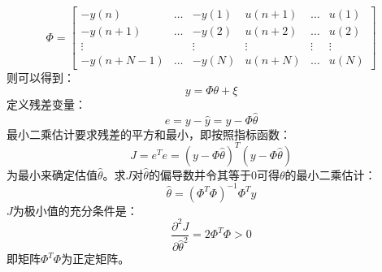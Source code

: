 \documentclass[UTF8]{article}
\begin{document}
\begin{equation*}
    \Phi = 
    \begin{bmatrix}
        -y(n) & \dots & -y(1) & u(n+1) & \dots & u(1) \\
        -y(n+1) & \dots & -y(2) & u(n+2) & \dots & u(2) \\
        \vdots & & \vdots & \vdots & \vdots & \vdots \\
        -y(n+N-1) & \dots & -y(N) & u(n+N) & \dots & u(N)
    \end{bmatrix}
\end{equation*}
则可以得到：
\begin{equation*}
    y = \Phi\theta + \xi
\end{equation*}
定义残差变量：
\begin{equation*}
    e = y - \hat{y} = y - \Phi\hat{\theta}
\end{equation*}
最小二乘估计要求残差的平方和最小，即按照指标函数：
\begin{equation*}
    J = e^Te = (y - \Phi\hat{\theta})^T(y - \Phi\hat{\theta})
\end{equation*}
为最小来确定估值$\hat{\theta}$。求$J$对$\hat{\theta}$的偏导数并令其等于0可得$\theta$的最小二乘估计：
\begin{equation*}
    \hat{\theta} = (\Phi^T\Phi)^{-1}\Phi^Ty
\end{equation*}
$J$为极小值的充分条件是：
\begin{equation*}
    \frac{\partial^2 J}{\partial \hat{\theta}^2} = 2\Phi^T\Phi > 0
\end{equation*}
即矩阵$\Phi^T\Phi$为正定矩阵。

\end{document}
